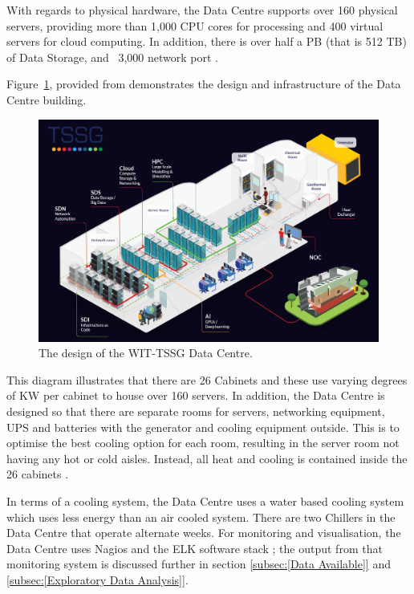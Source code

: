\documentclass[12pt]{scrartcl}
\begin{document}
With regards to physical hardware, the Data Centre supports over 160 physical servers, providing more than 1,000 CPU cores for processing and 400 virtual servers for cloud computing.  In addition, there is over half a PB (that is 512 TB) of Data Storage, and ~3,000 network port \citep{TSSG}. 

Figure~\ref{fig:TSSGdataCentreDesign}, provided from \citet{TSSG} demonstrates the design and infrastructure of the Data Centre building.  

\begin{figure}[h]
  \caption{The design of the WIT-TSSG Data Centre.}
  \label{fig:TSSGdataCentreDesign}
  \centering
    \includegraphics[scale=0.4]{TSSG_Diagram}
\end{figure}

This diagram illustrates that there are 26 Cabinets and these use varying degrees of KW per cabinet to house over 160 servers. In addition, the Data Centre is designed so that there are separate rooms for servers, networking equipment, UPS and batteries with the generator and cooling equipment outside. This is to optimise the best cooling option for each room, resulting in the server room not having any hot or cold aisles. Instead, all heat and cooling is contained inside the 26 cabinets \citep{TSSG}.

In terms of a cooling system, the Data Centre uses a water based cooling system which uses less energy than an air cooled system. There are two Chillers in the Data Centre that operate alternate weeks. For monitoring and visualisation, the Data Centre uses Nagios and the ELK software stack \citep{ELK}; the output from that monitoring system is discussed further in section \ref{subsec:[Data Available]} and \ref{subsec:[Exploratory Data Analysis]}. 
\end{document}
